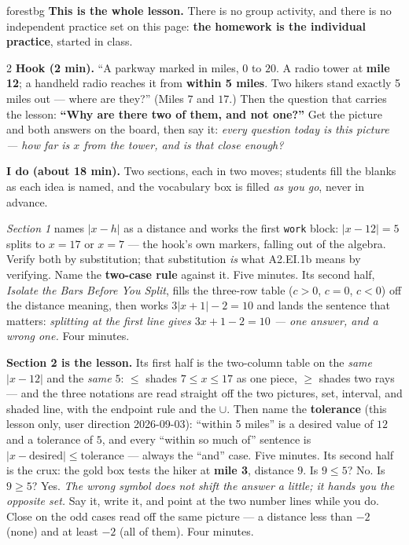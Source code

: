 \documentclass[10pt]{article}
\begin{document}
\boxguard
\begin{skillbox}{forestbg}
\textbf{This is the whole lesson.} There is no group activity, and there is no independent
practice set on this page: \textbf{the homework is the individual practice}, started in class.
\begin{multicols}{2}
\textbf{Hook (2 min).} ``A parkway marked in miles, $0$ to $20$. A radio tower at \textbf{mile
12}; a handheld radio reaches it from \textbf{within 5 miles}. Two hikers stand exactly 5 miles
out --- where are they?'' (Miles $7$ and $17$.) Then the question that carries the lesson:
\textbf{``Why are there two of them, and not one?''} Get the picture and both answers on the
board, then say it: \emph{every question today is this picture --- how far is $x$ from the
tower, and is that close enough?}

\textbf{I do (about 18 min).} Two sections, each in two moves; students fill the blanks as each
idea is named, and the vocabulary box is filled \emph{as you go}, never in advance.

\emph{Section 1} names $|x-h|$ as a distance and works the first \texttt{work} block:
$|x-12|=5$ splits to $x=17$ or $x=7$ --- the hook's own markers, falling out of the algebra.
Verify both by substitution; that substitution \emph{is} what A2.EI.1b means by verifying. Name
the \textbf{two-case rule} against it. Five minutes. Its second half, \emph{Isolate the Bars
Before You Split}, fills the three-row table ($c>0$, $c=0$, $c<0$) off the distance meaning,
then works $3|x+1|-2=10$ and lands the sentence that matters: \emph{splitting at the first line
gives $3x+1-2=10$ --- one answer, and a wrong one.} Four minutes.

\textbf{Section 2 is the lesson.} Its first half is the two-column table on the \emph{same}
$|x-12|$ and the \emph{same} $5$: $\le$ shades $7\le x\le17$ as one piece, $\ge$ shades two rays
--- and the three notations are read straight off the two pictures, set, interval, and shaded
line, with the endpoint rule and the $\cup$. Then name the \textbf{tolerance} (this lesson
only, user direction 2026-09-03): ``within 5 miles'' is a desired value of $12$ and a tolerance
of $5$, and every ``within so much of'' sentence is $|x-\text{desired}|\le\text{tolerance}$ ---
always the ``and'' case. Five minutes. Its second half is the crux: the
gold box tests the hiker at \textbf{mile 3}, distance $9$. Is $9\le5$? No. Is $9\ge5$? Yes.
\emph{The wrong symbol does not shift the answer a little; it hands you the opposite set.} Say
it, write it, and point at the two number lines while you do. Close on the odd cases read off
the same picture --- a distance less than $-2$ (none) and at least $-2$ (all of them). Four
minutes.


\end{multicols}
\end{skillbox}
\end{document}
